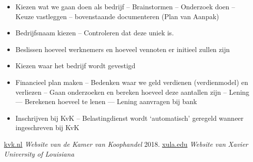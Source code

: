\documentclass[11pt,oneside,a4paper,numbers=enddot]{report} %
\begin{document}
\begin{itemize}
\item
  Kiezen wat we gaan doen als bedrijf
  -- Brainstormen
  -- Onderzoek doen
  -- Keuze vastleggen
  -- bovenstaande documenteren (Plan van Aanpak)
\item
  Bedrijfsnaam kiezen
  -- Controleren dat deze uniek is.
\item
  Beslissen hoeveel werknemers en
  hoeveel vennoten er initieel zullen zijn
\item
  Kiezen waar het bedrijf wordt gevestigd
\item
  Financieel plan maken
  -- Bedenken waar we geld verdienen (verdienmodel) en verliezen
  -- Gaan onderzoeken en bereken hoeveel deze aantallen zijn
  -- Lening
  --- Berekenen hoeveel te lenen
  --- Lening aanvragen bij bank
\item
  Inschrijven bij KvK -- Belastingdienst wordt `automatisch' geregeld
  wanneer ingeschreven bij KvK
\end{itemize}

\begin{thebibliography}{1}

 \href{https://www.kvk.nl}{kvk.nl} {\em Website van de Kamer van Koophandel}  2018.
 \href{https://cat.xula.edu/tutorials/planning/designdoc}{xula.edu} {\em Website van Xavier University of Louisiana}

\end{thebibliography}
\end{document}
